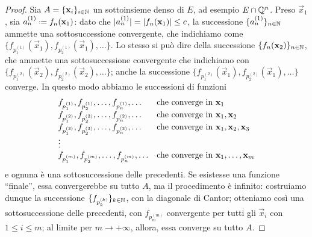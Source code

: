 \begin{proof}
    Sia $A=\{\mathbf{x}_i\}_{i\in\mathbb{N}}$ un sottoinsieme denso di $E$, ad esempio $E\cap\mathbb{Q}^n$.
    Preso $\vec x_1$, sia $a^{(1)}_n\defeq f_n(\vec x_1)$: dato che $\lvert a^{(1)}_n\rvert=\lvert f_n(\mathbf{x}_1)\rvert\le c$, la successione $\{a^{(1)}_n\}_{n\in\mathbb{N}}$ ammette una sottosuccessione convergente, che indichiamo come $\{f_{p^{(1)}_1}(\vec x_1),f_{p^{(1)}_2}(\vec x_1),\dotsc\}$.
    Lo stesso si può dire della successione $\{f_n(\mathbf{x}_2)\}_{n\in\mathbb{N}}$, che ammette una sottosuccessione convergente che indichiamo con $\{f_{p^{(2)}_1}(\vec x_2),f_{p^{(2)}_2}(\vec x_2),\dotsc\}$; anche la successione $\{f_{p^{(2)}_1}(\vec x_1),f_{p^{(2)}_2}(\vec x_1),\dotsc\}$ converge.
    In questo modo abbiamo le successioni di funzioni
    \begin{equation}
        \begin{array}[h]{ll}
            f_{p^{(1)}_1},f_{p^{(1)}_2},\dotsc,f_{p^{(1)}_n},\dotsc & \text{che converge in }\vec x_1\\
            f_{p^{(2)}_1},f_{p^{(2)}_2},\dotsc,f_{p^{(2)}_n},\dotsc & \text{che converge in }\vec x_1,\vec x_2\\
            f_{p^{(3)}_1},f_{p^{(3)}_2},\dotsc,f_{p^{(3)}_n},\dotsc & \text{che converge in }\vec x_1,\vec x_2,\vec x_3\\
            \vdots & \\
            f_{p^{(m)}_1},f_{p^{(m)}_2},\dotsc,f_{p^{(m)}_n},\dotsc & \text{che converge in }\vec x_1,\dotsc,\vec x_m
        \end{array}
    \end{equation}
    e ognuna è una sottosuccessione delle precedenti.
    Se esistesse una funzione ``finale'', essa convergerebbe su tutto $A$, ma il procedimento è infinito: costruiamo dunque la successione $\{f_{p^{(k)}_k}\}_{k\in\mathbb{N}}$, con la diagonale di Cantor; otteniamo cos\`i una sottosuccessione delle precedenti, con $f_{p^{(m)}_m}$ convergente per tutti gli $\vec x_i$ con $1\le i\le m$; al limite per $m\to+\infty$, allora, essa converge su tutto $A$.


\end{proof}
